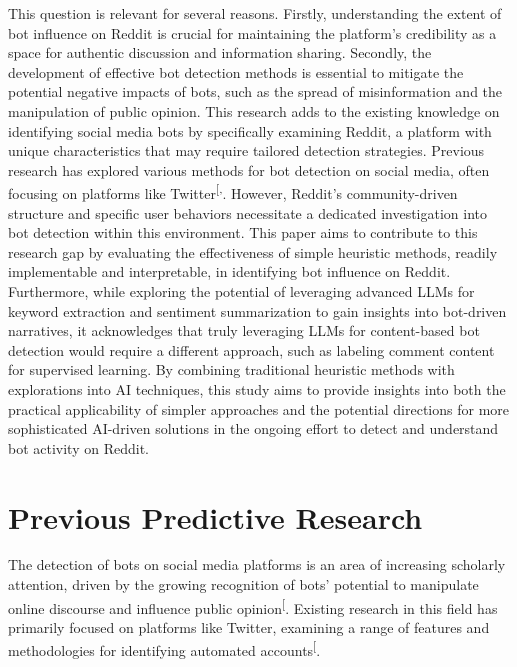\documentclass[
  12pt,
  letterpaper,
  DIV=11,
  numbers=noendperiod]{scrartcl}
\begin{document}
This question is relevant for several reasons. Firstly, understanding
the extent of bot influence on Reddit is crucial for maintaining the
platform's credibility as a space for authentic discussion and
information sharing. Secondly, the development of effective bot
detection methods is essential to mitigate the potential negative
impacts of bots, such as the spread of misinformation and the
manipulation of public opinion. This research adds to the existing
knowledge on identifying social media bots by specifically examining
Reddit, a platform with unique characteristics that may require tailored
detection strategies. Previous research has explored various methods for
bot detection on social media, often focusing on platforms like
Twitter\textsuperscript{{[},\citeproc{ref-multibotdetector}{4}{]}}.
However, Reddit's community-driven structure and specific user behaviors
necessitate a dedicated investigation into bot detection within this
environment. This paper aims to contribute to this research gap by
evaluating the effectiveness of simple heuristic methods, readily
implementable and interpretable, in identifying bot influence on Reddit.
Furthermore, while exploring the potential of leveraging advanced LLMs
for keyword extraction and sentiment summarization to gain insights into
bot-driven narratives, it acknowledges that truly leveraging LLMs for
content-based bot detection would require a different approach, such as
labeling comment content for supervised learning. By combining
traditional heuristic methods with explorations into AI techniques, this
study aims to provide insights into both the practical applicability of
simpler approaches and the potential directions for more sophisticated
AI-driven solutions in the ongoing effort to detect and understand bot
activity on Reddit.

\section{Previous Predictive
Research}\label{previous-predictive-research}

The detection of bots on social media platforms is an area of increasing
scholarly attention, driven by the growing recognition of bots'
potential to manipulate online discourse and influence public
opinion\textsuperscript{{[}\citeproc{ref-multibotdetector}{4}{]}}.
Existing research in this field has primarily focused on platforms like
Twitter, examining a range of features and methodologies for identifying
automated
accounts\textsuperscript{{[}\citeproc{ref-redditbotwatch}{3}{]}}.
\end{document}
